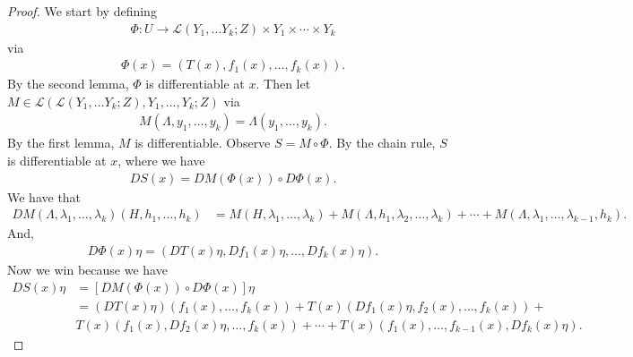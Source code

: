 \documentclass{report}
\begin{document}
\begin{proof}
    We start by defining
    \begin{align*}
        \Phi: U \to \mathcal L(Y_1, \ldots Y_k; Z) \times Y_1 \times \cdots \times Y_k
    \end{align*}
    via
    \begin{align*}
        \Phi(x) = (T(x), f_1(x), \ldots, f_k(x)).
    \end{align*}
    By the second lemma, $\Phi$ is differentiable at $x$. Then let $M \in \mathcal L( \mathcal L(Y_1, \ldots Y_k; Z), Y_1, \ldots, Y_k; Z)$ via 
    \begin{align*}
        M(\Lambda, y_1, \ldots, y_k) = \Lambda(y_1, \ldots, y_k).
    \end{align*}
    By the first lemma, $M$ is differentiable. Observe $S = M \circ \Phi$. By the chain rule, $S$ is differentiable at $x$, where we have 
    \begin{align*}
        DS(x) = DM(\Phi(x)) \circ D\Phi(x).
    \end{align*}
    We have that 
    \begin{align*}
        DM(\Lambda, \lambda_1, \ldots, \lambda_k)(H, h_1, \ldots, h_k) &= M(H, \lambda_1, \ldots, \lambda_k) + M(\Lambda, h_1, \lambda_2, \ldots, \lambda_k) + \cdots + M(\Lambda, \lambda_1, \ldots, \lambda_{k-1}, h_k).
    \end{align*}
    And,
    \begin{align*}
        D\Phi(x)\eta = (DT(x)\eta, Df_1(x)\eta, \ldots, Df_k(x)\eta).
    \end{align*}
    Now we win because we have
    \begin{align*}
        DS(x)\eta &= [DM(\Phi(x)) \circ D\Phi(x)]\eta \\
        &= (DT(x)\eta)(f_1(x), \ldots, f_k(x)) + T(x)(Df_1(x)\eta, f_2(x), \ldots, f_k(x)) + \\
        &T(x)(f_1(x), Df_2(x)\eta, \ldots, f_k(x)) + \cdots + T(x)(f_1(x), \ldots, f_{k-1}(x), Df_k(x)\eta).
    \end{align*}
\end{proof}
\newpage
\end{document}
